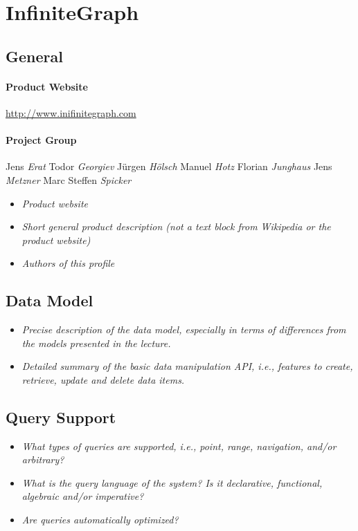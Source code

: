 \section{InfiniteGraph}

\subsection{General}

\paragraph{Product Website} \url{http://www.inifinitegraph.com}

\paragraph{Project Group}
Jens \textit{Erat}
Todor \textit{Georgiev}
J\"{u}rgen \textit{H\"{o}lsch}
Manuel \textit{Hotz}
Florian \textit{Junghaus}
Jens \textit{Metzner}
Marc Steffen \textit{Spicker}

\begin{itemize}
\item \emph{Product website}
\item \emph{Short general product description (not a text block from Wikipedia or the product website)}
\item \emph{Authors of this profile}
\end{itemize}

\subsection{Data Model}
\begin{itemize}
\item \emph{Precise description of the data model, especially in terms of differences from the  models presented in the lecture.}
\item \emph{Detailed summary of the basic data manipulation API, i.e., features to create, retrieve, update and delete data items.}
\end{itemize}

\subsection{Query Support}
\begin{itemize}
\item \emph{What types of queries are supported, i.e., point, range, navigation, and/or arbitrary?}
\item \emph{What is the query language of the system? Is it declarative, functional, algebraic and/or imperative?}
\item \emph{Are queries automatically optimized?}
\end{itemize}

